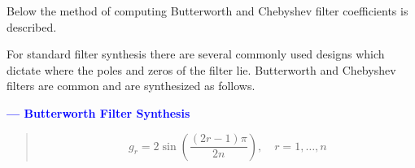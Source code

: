 \documentclass[10pt,conference]{IEEEtran}
\begin{document}
Below the method of computing Butterworth and Chebyshev filter coefficients is described.



For standard filter synthesis there are several commonly used designs which dictate where the poles and zeros of the filter lie. Butterworth and Chebyshev filters are common and are synthesized as follows.



\textcolor{blue}{ \textbf{ --- Butterworth Filter Synthesis} }
\begin{quote}
	\begin{equation}\label{eq:gr_sine}
	g_r = 2 \sin\left( \frac{(2r - 1)\pi}{2n} \right), \quad r = 1, \ldots, n
	\end{equation}
\end{quote}

$~$
$~$
\end{document}
